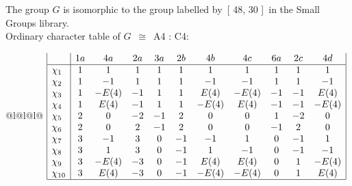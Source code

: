 \documentclass[varwidth=\maxdimen,border=10]{standalone}
\begin{document}
The group $G$ is isomorphic to the group labelled by\ [ 48, 30 ]\ in the Small Groups library.\\
Ordinary character table of $G$\ $\cong$\ A4 : C4:\\
\begin{center}
\begin{tabular}{@{}l@{}l@{}l@{}}
\hline
\(\begin{array}{|l|cccccccccc|}
  & 1a & 4a & 2a & 3a & 2b & 4b & 4c & 6a & 2c & 4d\\ \hline
\chi_{1} & 1 & 1 & 1 & 1 & 1 & 1 & 1 & 1 & 1 & 1\\
\chi_{2} & 1 & -1 & 1 & 1 & 1 & -1 & -1 & 1 & 1 & -1\\
\chi_{3} & 1 & -E(4) & -1 & 1 & 1 & E(4) & -E(4) & -1 & -1 & E(4)\\
\chi_{4} & 1 & E(4) & -1 & 1 & 1 & -E(4) & E(4) & -1 & -1 & -E(4)\\
\chi_{5} & 2 & 0 & -2 & -1 & 2 & 0 & 0 & 1 & -2 & 0\\
\chi_{6} & 2 & 0 & 2 & -1 & 2 & 0 & 0 & -1 & 2 & 0\\
\chi_{7} & 3 & -1 & 3 & 0 & -1 & -1 & 1 & 0 & -1 & 1\\
\chi_{8} & 3 & 1 & 3 & 0 & -1 & 1 & -1 & 0 & -1 & -1\\
\chi_{9} & 3 & -E(4) & -3 & 0 & -1 & E(4) & E(4) & 0 & 1 & -E(4)\\
\chi_{10} & 3 & E(4) & -3 & 0 & -1 & -E(4) & -E(4) & 0 & 1 & E(4)\\
\hline
\end{array}\)\\
\end{tabular}
\end{center}
\end{document}
